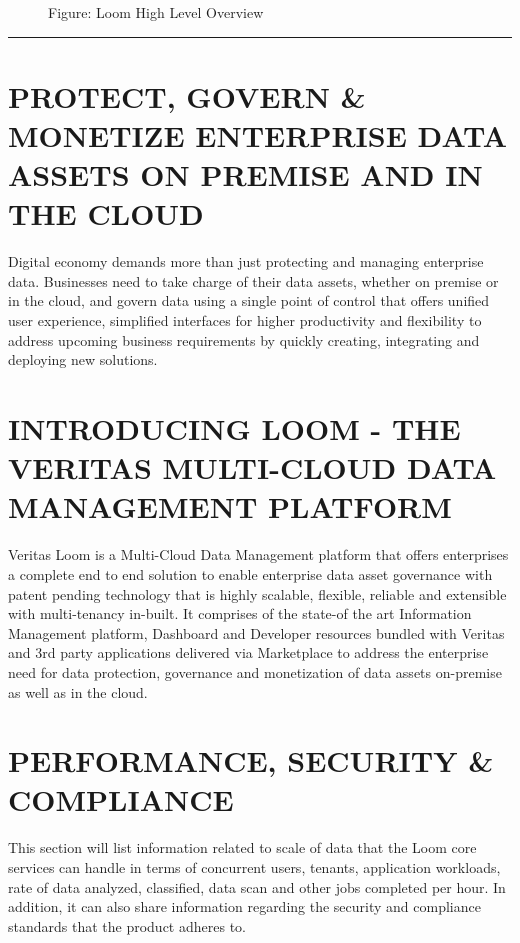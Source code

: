 \documentclass[letterpaper,10pt,english]{sphinxhowto}
\begin{document}
\begin{figure}[htbp]
\centering
\capstart

\noindent{}
\caption{Figure: Loom High Level Overview}\label{\detokenize{col/ds/mcdmp_ds_opt1:id1}}\end{figure}


\bigskip\hrule\bigskip



\section{PROTECT, GOVERN \& MONETIZE ENTERPRISE DATA ASSETS ON PREMISE AND IN THE CLOUD}
\label{\detokenize{col/ds/mcdmp_ds_opt1:protect-govern-monetize-enterprise-data-assets-on-premise-and-in-the-cloud}}
Digital economy demands more than just protecting and managing enterprise data. Businesses need to take charge of their data assets, whether on premise or in the cloud, and govern data using a single point of control that offers unified user experience, simplified interfaces for higher productivity and flexibility to address upcoming business requirements by quickly creating, integrating and deploying new solutions.


\section{INTRODUCING LOOM - THE VERITAS MULTI-CLOUD DATA MANAGEMENT PLATFORM}
\label{\detokenize{col/ds/mcdmp_ds_opt1:introducing-loom-the-veritas-multi-cloud-data-management-platform}}
Veritas Loom is a Multi-Cloud Data Management platform that offers enterprises a complete end to end solution to enable enterprise data asset governance with patent pending technology that is highly scalable, flexible, reliable and extensible with multi-tenancy in-built. It comprises of the state-of \textendash{}the art Information Management platform, Dashboard and Developer resources bundled with Veritas and 3rd party applications delivered via Marketplace to address the enterprise need for data protection, governance and monetization of data assets on-premise as well as in the cloud.


\section{PERFORMANCE, SECURITY \& COMPLIANCE}
\label{\detokenize{col/ds/mcdmp_ds_opt1:performance-security-compliance}}
This section will list information related to scale of data that the Loom core services can handle in terms of concurrent users, tenants, application workloads, rate of data analyzed, classified, data scan and other jobs completed per hour. In addition, it can also share information regarding the security and compliance standards that the product adheres to.
\end{document}

